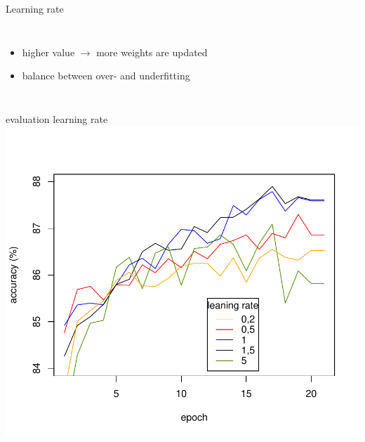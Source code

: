 \documentclass[aspectratio=1610, 12pt]{beamer}
\begin{document}
\begin{frame}{Learning rate}
	\begin{columns}
		\begin{itemize}
			\item higher value $\rightarrow$ more weights are updated
			\item balance between over- and underfitting
		\end{itemize}
		



	\end{columns}

\end{frame}
\begin{frame}{evaluation learning rate}
	\centering
	\vspace*{-1cm}\includegraphics[scale=0.6]{images/learningrate_measurement.pdf}
\end{frame}
\end{document}
